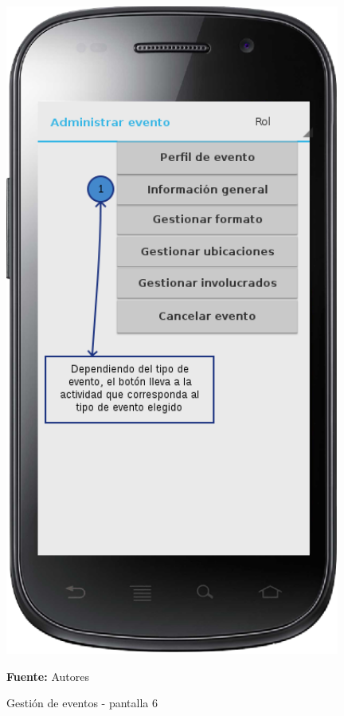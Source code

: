 \begin{figure}[!htb]
  \begin{center}
    \includegraphics[width=11cm]{./imagenes/UI/Eventos/gestion_eventos_6.png}
    \caption{Gestión de eventos - pantalla 6}
    \label{fig:gestion_eventos_6}
    \textbf{Fuente:}  Autores
  \end{center}
\end{figure}

